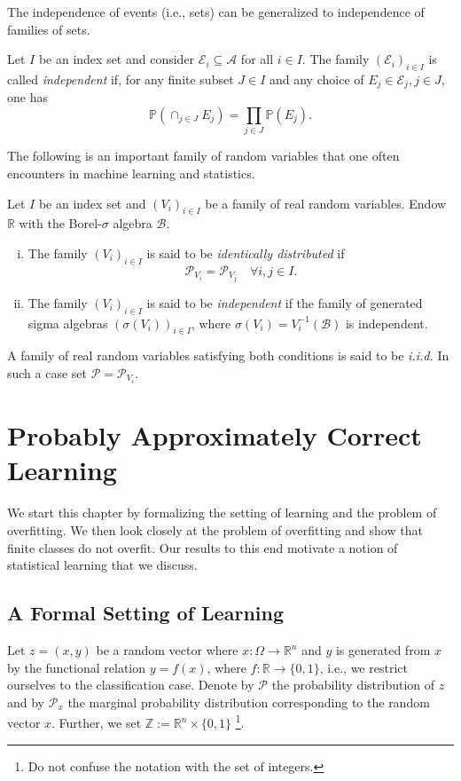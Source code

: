 The independence of events (i.e., sets) can be generalized to independence of
families of sets. 
\begin{definition}
        Let $I$ be an index set and consider $\mathcal{E}_i \subseteq \mathcal{A}$ for all $i \in I$.
        The family $(\mathcal{E}_i)_{i \in I}$ is called \emph{independent} if, for any finite subset 
        $J \in I$ and any choice of $E_j \in \mathcal{E}_j, j \in J$, one has 
        $$
        \mathbb{P}(\cap_{j \in J} E_j) = \prod_{j \in J} \mathbb{P}(E_j).
        $$
\end{definition}
The following is an important family of random variables that one often encounters 
in machine learning and statistics. 
\begin{definition}
	\label{def:iid}
	Let $I$ be an index set and $(V_i)_{i \in I}$ be a family of real random 
	variables. Endow $\mathbb{R}$ with the Borel-$\sigma$ algebra $\mathcal{B}$.
	\begin{enumerate}[(i)]
		\item The family $(V_i)_{i \in I}$ is said to be \emph{identically distributed} if 
		$$\mathcal{P}_{V_i} = \mathcal{P}_{V_j} \quad \forall i, j \in I.$$
		\item The family $(V_i)_{i \in I}$ is said to be \emph{independent} if the 
		family of generated sigma algebras $(\sigma(V_i))_{i\in I}$, where 
		$\sigma(V_i) = V_i^{-1}(\mathcal{B})$ is independent.
	\end{enumerate}
A family of real random variables satisfying both conditions is said to be \emph{i.i.d.}
In such a case set $\mathcal{P} = \mathcal{P}_{V_i}$. \end{definition}

\section{Probably Approximately Correct Learning}

We start this chapter by formalizing the setting of learning and the problem of
overfitting. We then look closely at the problem of overfitting and show that
finite classes do not overfit. Our results to this end motivate a notion of
statistical learning that we discuss.

\subsection{A Formal Setting of Learning}
Let $z = (x, y)$ be a random vector where $x: \Omega \to \mathbb{R}^n$ and $y$
is generated from $x$ by the functional relation $y=f(x)$, where $f: \mathbb{R}
\to \{0,1\}$, i.e., we restrict ourselves to the classification case. Denote by
$\mathcal{P}$ the probability distribution of $z$ and by $\mathcal{P}_x$ the
marginal probability distribution corresponding to the random vector $x$.
Further, we set $\mathbb{Z} := \mathbb{R}^n \times \{0,1\}$ \footnote{Do not
confuse the notation with the set of integers.}.

